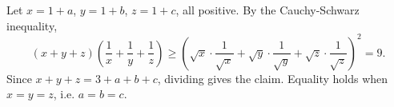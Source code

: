 Let $x=1+a$, $y=1+b$, $z=1+c$, all positive. By the Cauchy-Schwarz inequality,
\[(x+y+z)\left(\dfrac{1}{x}+\dfrac{1}{y}+\dfrac{1}{z}\right)\ge\left(\sqrt x\cdot\dfrac{1}{\sqrt x}+\sqrt y\cdot\dfrac{1}{\sqrt y}+\sqrt z\cdot\dfrac{1}{\sqrt z}\right)^2=9 .\]
Since $x+y+z=3+a+b+c$, dividing gives the claim. Equality holds when $x=y=z$, i.e. $a=b=c$.
